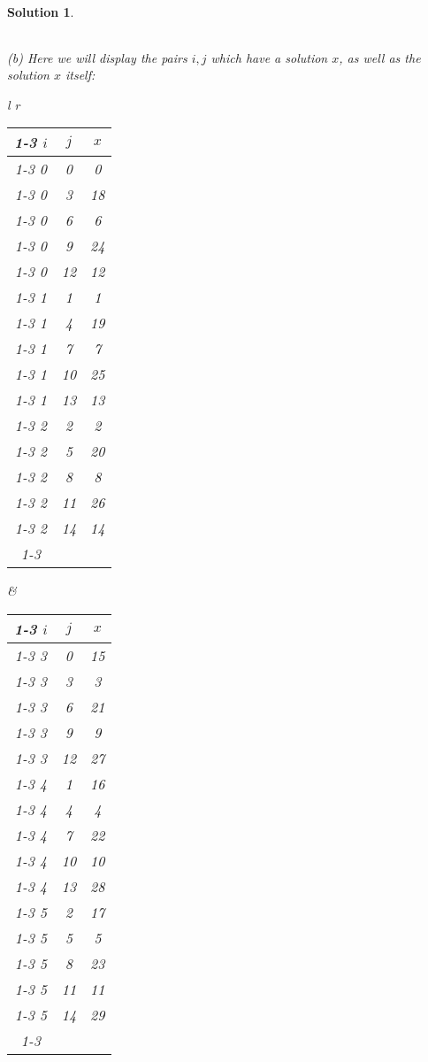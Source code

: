 \documentclass[12pt]{article}
\theoremstyle{moo}
\newtheorem*{sol}{Solution}
\begin{document}
\begin{sol}
\begin{tabular}{lll}
\end{tabular}

\newpage

(b) Here we will display the pairs $i,j$ which have a solution $x$, as well as the solution $x$ itself:

\hspace{1cm}

\begin{tabular}{l  r}

\begin{tabular}{|c|c|c|}

\cline{1-3}
$i$ & $j$ & $x$ \\
\cline{1-3}
\cline{1-3}
0 & 0 & 0 \\
\cline{1-3}
0 & 3 & 18 \\
\cline{1-3}
0 & 6 & 6 \\
\cline{1-3}
0 & 9 & 24 \\
\cline{1-3}
0 & 12 & 12 \\
\cline{1-3}
1 & 1 & 1 \\
\cline{1-3}
1 & 4 & 19 \\
\cline{1-3}
1 & 7 & 7 \\
\cline{1-3}
1 & 10 & 25 \\
\cline{1-3}
1 & 13 & 13 \\
\cline{1-3}
2 & 2 & 2 \\
\cline{1-3}
2 & 5 & 20 \\
\cline{1-3}
2 & 8 & 8 \\
\cline{1-3}
2 & 11 & 26 \\
\cline{1-3}
2 & 14 & 14 \\
\cline{1-3}

\end{tabular}
&
\begin{tabular}{|c|c|c|}

\cline{1-3}
$i$ & $j$ & $x$ \\
\cline{1-3}
\cline{1-3}
3 & 0 & 15 \\
\cline{1-3}
3 & 3 & 3 \\
\cline{1-3}
3 & 6 & 21 \\
\cline{1-3}
3 & 9 & 9 \\
\cline{1-3}
3 & 12 & 27 \\
\cline{1-3}
4 & 1 & 16 \\
\cline{1-3}
4 & 4 & 4 \\
\cline{1-3}
4 & 7 & 22 \\
\cline{1-3}
4 & 10 & 10 \\
\cline{1-3}
4 & 13 & 28 \\
\cline{1-3}
5 & 2 & 17 \\
\cline{1-3}
5 & 5 & 5 \\
\cline{1-3}
5 & 8 & 23 \\
\cline{1-3}
5 & 11 & 11 \\
\cline{1-3}
5 & 14 & 29 \\
\cline{1-3}

\end{tabular}


\end{tabular}

\end{sol}
\end{document}
